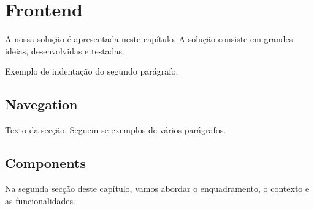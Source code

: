 \chapter{Frontend} \label{cap:frontend}

A nossa solução é apresentada neste capítulo. A solução consiste em grandes ideias, desenvolvidas e testadas.

Exemplo de indentação do segundo parágrafo.

\section{Navegation} \label{sec51}
Texto da secção. Seguem-se exemplos de vários parágrafos.

\section{Components} \label{sec52}
Na segunda secção deste capítulo, vamos abordar o enquadramento,
o contexto e as funcionalidades.
